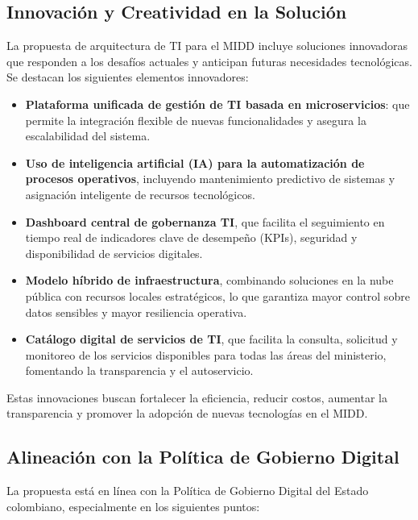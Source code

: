 \subsection{Innovación y Creatividad en la Solución}

La propuesta de arquitectura de TI para el MIDD incluye soluciones innovadoras que responden a los desafíos actuales y anticipan futuras necesidades tecnológicas. Se destacan los siguientes elementos innovadores:

\begin{itemize}
  \item \textbf{Plataforma unificada de gestión de TI basada en microservicios}: que permite la integración flexible de nuevas funcionalidades y asegura la escalabilidad del sistema.
  \item \textbf{Uso de inteligencia artificial (IA) para la automatización de procesos operativos}, incluyendo mantenimiento predictivo de sistemas y asignación inteligente de recursos tecnológicos.
  \item \textbf{Dashboard central de gobernanza TI}, que facilita el seguimiento en tiempo real de indicadores clave de desempeño (KPIs), seguridad y disponibilidad de servicios digitales.
  \item \textbf{Modelo híbrido de infraestructura}, combinando soluciones en la nube pública con recursos locales estratégicos, lo que garantiza mayor control sobre datos sensibles y mayor resiliencia operativa.
  \item \textbf{Catálogo digital de servicios de TI}, que facilita la consulta, solicitud y monitoreo de los servicios disponibles para todas las áreas del ministerio, fomentando la transparencia y el autoservicio.
\end{itemize}

Estas innovaciones buscan fortalecer la eficiencia, reducir costos, aumentar la transparencia y promover la adopción de nuevas tecnologías en el MIDD.

\subsection{Alineación con la Política de Gobierno Digital}

La propuesta está en línea con la Política de Gobierno Digital del Estado colombiano, especialmente en los siguientes puntos:

